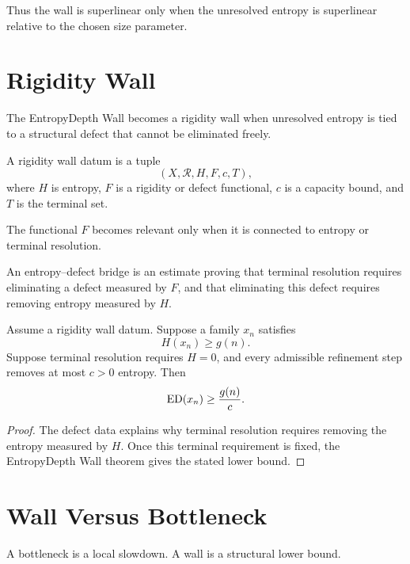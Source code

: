 Thus the wall is superlinear only when the unresolved entropy is superlinear
relative to the chosen size parameter.

\section{Rigidity Wall}

The EntropyDepth Wall becomes a rigidity wall when unresolved entropy is tied
to a structural defect that cannot be eliminated freely.

\begin{definition}
A rigidity wall datum is a tuple
\[
(X,\mathcal R,H,F,c,T),
\]
where \(H\) is entropy, \(F\) is a rigidity or defect functional, \(c\) is a
capacity bound, and \(T\) is the terminal set.
\end{definition}

The functional \(F\) becomes relevant only when it is connected to entropy or
terminal resolution.

\begin{definition}
An entropy--defect bridge is an estimate proving that terminal resolution
requires eliminating a defect measured by \(F\), and that eliminating this
defect requires removing entropy measured by \(H\).
\end{definition}

\begin{theorem}
Assume a rigidity wall datum. Suppose a family \(x_n\) satisfies
\[
H(x_n)\ge g(n).
\]
Suppose terminal resolution requires \(H=0\), and every admissible refinement
step removes at most \(c>0\) entropy. Then
\[
\mathrm{ED}(x_n)\ge \frac{g(n)}{c}.
\]
\end{theorem}

\begin{proof}
The defect data explains why terminal resolution requires removing the entropy
measured by \(H\). Once this terminal requirement is fixed, the EntropyDepth
Wall theorem gives the stated lower bound.
\end{proof}

\section{Wall Versus Bottleneck}

A bottleneck is a local slowdown. A wall is a structural lower bound.

